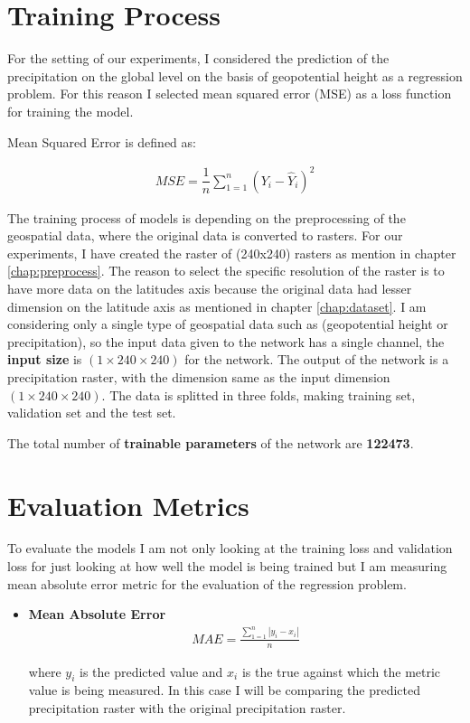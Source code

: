 \newpage

\section{Training Process}

For the setting of our experiments, I considered the prediction of the precipitation on the global level on the basis of geopotential height as a regression problem. For this reason I selected mean squared error (MSE) as a loss function for training the model.

Mean Squared Error is defined as:

\begin{gather*}
    MSE = \dfrac{1}{n}\sum_{1 = 1}^{n}(Y_i-\hat{Y}_i )^2
\end{gather*}

The training process of models is depending on the preprocessing of the geospatial data, where the original data is converted to rasters. For our experiments, I have created the raster of (240x240) rasters as mention in chapter \ref{chap:preprocess}. The reason to select the specific resolution of the raster is to have more data on the latitudes axis because the original data had lesser dimension on the latitude axis as mentioned in chapter \ref{chap:dataset}.
I am considering only a single type of geospatial data such as (geopotential height or precipitation), so the input data given to the network has a single channel,  the \textbf{input size} is $(1 \times 240  \times 240)$ for the network.
The output of the network is a precipitation raster, with the dimension same as the input dimension $(1 \times 240  \times 240)$. The data is splitted in three folds, making training set, validation set and the test set.

The total number of \textbf{trainable parameters} of the network are \textbf{122473}.
\section{Evaluation Metrics}

To evaluate the models I am not only looking at the training loss and validation loss for just looking at how well the model is being trained but I am measuring mean absolute error metric for the evaluation of the regression problem.
\begin{itemize}
    \item \textbf{Mean Absolute Error}\\
          \begin{gather*}
              MAE = \frac{\sum_{1 = 1}^{n}\left\lvert
                  y_i - x_i
                  \right\rvert}{n}
          \end{gather*}

          where $y_i$ is the predicted value and $x_i$ is the true against which the metric value is being measured. In this case I will be comparing the predicted precipitation raster with the original precipitation raster.
\end{itemize}